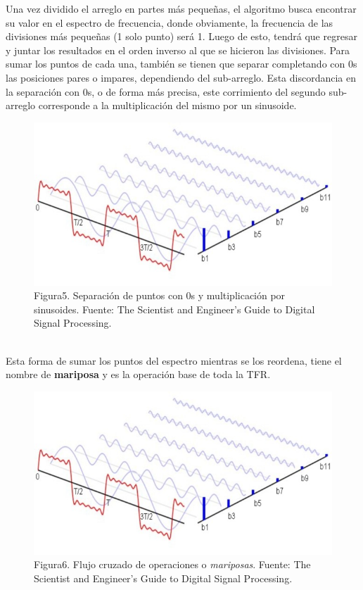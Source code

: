 \documentclass[review,1p]{elsarticle}
\begin{document}
Una vez dividido el arreglo en partes más pequeñas, el algoritmo busca encontrar su valor en el espectro de frecuencia, donde obviamente, la frecuencia de las divisiones más pequeñas (1 solo punto) será 1. Luego de esto, tendrá que regresar y juntar los resultados en el orden inverso al que se hicieron las divisiones. Para sumar los puntos de cada una, también se tienen que separar completando con 0s las posiciones pares o impares, dependiendo del sub-arreglo. Esta discordancia en la separación con 0s, o de forma más precisa, este corrimiento del segundo sub-arreglo corresponde a la multiplicación del mismo por un sinusoide. \\
\begin{figure}[h]
    \centering
    \includegraphics[scale=0.5]{Figuras/Serie-transformada.jpg}
    \\
    \small Figura5. Separación de puntos con 0s y multiplicación por sinusoides. Fuente: The Scientist and Engineer's Guide to Digital Signal Processing.\\
\end{figure}\\
Esta forma de sumar los puntos del espectro mientras se los reordena, tiene el nombre de \textbf{mariposa} y es la operación base de toda la TFR. \\
\begin{figure}[h]
    \centering
    \includegraphics[scale=0.5]{Figuras/Serie-transformada.jpg}
    \\
    \small Figura6. Flujo cruzado de operaciones o \textit{mariposas}. Fuente: The Scientist and Engineer's Guide to Digital Signal Processing.\\
\end{figure}\\
\end{document}
